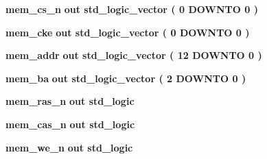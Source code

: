 \begin{DoxyCompactItemize}
\item 
{\bf mem\+\_\+cs\+\_\+n}  {\bfseries {\bfseries \textcolor{keywordflow}{out}\textcolor{vhdlchar}{ }}} {\bfseries \textcolor{comment}{std\+\_\+logic\+\_\+vector}\textcolor{vhdlchar}{ }\textcolor{vhdlchar}{(}\textcolor{vhdlchar}{ }\textcolor{vhdlchar}{ } \textcolor{vhdldigit}{0} \textcolor{vhdlchar}{ }\textcolor{keywordflow}{D\+O\+W\+N\+TO}\textcolor{vhdlchar}{ }\textcolor{vhdlchar}{ } \textcolor{vhdldigit}{0} \textcolor{vhdlchar}{ }\textcolor{vhdlchar}{)}\textcolor{vhdlchar}{ }} 
\item 
{\bf mem\+\_\+cke}  {\bfseries {\bfseries \textcolor{keywordflow}{out}\textcolor{vhdlchar}{ }}} {\bfseries \textcolor{comment}{std\+\_\+logic\+\_\+vector}\textcolor{vhdlchar}{ }\textcolor{vhdlchar}{(}\textcolor{vhdlchar}{ }\textcolor{vhdlchar}{ } \textcolor{vhdldigit}{0} \textcolor{vhdlchar}{ }\textcolor{keywordflow}{D\+O\+W\+N\+TO}\textcolor{vhdlchar}{ }\textcolor{vhdlchar}{ } \textcolor{vhdldigit}{0} \textcolor{vhdlchar}{ }\textcolor{vhdlchar}{)}\textcolor{vhdlchar}{ }} 
\item 
{\bf mem\+\_\+addr}  {\bfseries {\bfseries \textcolor{keywordflow}{out}\textcolor{vhdlchar}{ }}} {\bfseries \textcolor{comment}{std\+\_\+logic\+\_\+vector}\textcolor{vhdlchar}{ }\textcolor{vhdlchar}{(}\textcolor{vhdlchar}{ }\textcolor{vhdlchar}{ } \textcolor{vhdldigit}{12} \textcolor{vhdlchar}{ }\textcolor{keywordflow}{D\+O\+W\+N\+TO}\textcolor{vhdlchar}{ }\textcolor{vhdlchar}{ } \textcolor{vhdldigit}{0} \textcolor{vhdlchar}{ }\textcolor{vhdlchar}{)}\textcolor{vhdlchar}{ }} 
\item 
{\bf mem\+\_\+ba}  {\bfseries {\bfseries \textcolor{keywordflow}{out}\textcolor{vhdlchar}{ }}} {\bfseries \textcolor{comment}{std\+\_\+logic\+\_\+vector}\textcolor{vhdlchar}{ }\textcolor{vhdlchar}{(}\textcolor{vhdlchar}{ }\textcolor{vhdlchar}{ } \textcolor{vhdldigit}{2} \textcolor{vhdlchar}{ }\textcolor{keywordflow}{D\+O\+W\+N\+TO}\textcolor{vhdlchar}{ }\textcolor{vhdlchar}{ } \textcolor{vhdldigit}{0} \textcolor{vhdlchar}{ }\textcolor{vhdlchar}{)}\textcolor{vhdlchar}{ }} 
\item 
{\bf mem\+\_\+ras\+\_\+n}  {\bfseries {\bfseries \textcolor{keywordflow}{out}\textcolor{vhdlchar}{ }}} {\bfseries \textcolor{comment}{std\+\_\+logic}\textcolor{vhdlchar}{ }} 
\item 
{\bf mem\+\_\+cas\+\_\+n}  {\bfseries {\bfseries \textcolor{keywordflow}{out}\textcolor{vhdlchar}{ }}} {\bfseries \textcolor{comment}{std\+\_\+logic}\textcolor{vhdlchar}{ }} 
\item 
{\bf mem\+\_\+we\+\_\+n}  {\bfseries {\bfseries \textcolor{keywordflow}{out}\textcolor{vhdlchar}{ }}} {\bfseries \textcolor{comment}{std\+\_\+logic}\textcolor{vhdlchar}{ }} 

\end{DoxyCompactItemize}
